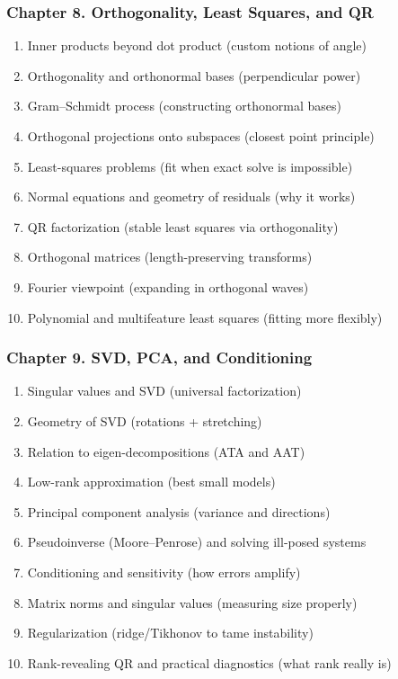 \documentclass[
  letterpaper,
  DIV=11,
  numbers=noendperiod]{scrreprt}
\providecommand{\tightlist}{%
  \setlength{\itemsep}{0pt}\setlength{\parskip}{0pt}}
\begin{document}
\subsubsection{Chapter 8. Orthogonality, Least Squares, and
QR}\label{chapter-8.-orthogonality-least-squares-and-qr}

\begin{enumerate}
\def\labelenumi{\arabic{enumi}.}
\setcounter{enumi}{70}
\tightlist
\item
  Inner products beyond dot product (custom notions of angle)
\item
  Orthogonality and orthonormal bases (perpendicular power)
\item
  Gram--Schmidt process (constructing orthonormal bases)
\item
  Orthogonal projections onto subspaces (closest point principle)
\item
  Least-squares problems (fit when exact solve is impossible)
\item
  Normal equations and geometry of residuals (why it works)
\item
  QR factorization (stable least squares via orthogonality)
\item
  Orthogonal matrices (length-preserving transforms)
\item
  Fourier viewpoint (expanding in orthogonal waves)
\item
  Polynomial and multifeature least squares (fitting more flexibly)
\end{enumerate}

\subsubsection{Chapter 9. SVD, PCA, and
Conditioning}\label{chapter-9.-svd-pca-and-conditioning}

\begin{enumerate}
\def\labelenumi{\arabic{enumi}.}
\setcounter{enumi}{80}
\tightlist
\item
  Singular values and SVD (universal factorization)
\item
  Geometry of SVD (rotations + stretching)
\item
  Relation to eigen-decompositions (ATA and AAT)
\item
  Low-rank approximation (best small models)
\item
  Principal component analysis (variance and directions)
\item
  Pseudoinverse (Moore--Penrose) and solving ill-posed systems
\item
  Conditioning and sensitivity (how errors amplify)
\item
  Matrix norms and singular values (measuring size properly)
\item
  Regularization (ridge/Tikhonov to tame instability)
\item
  Rank-revealing QR and practical diagnostics (what rank really is)
\end{enumerate}
\end{document}
